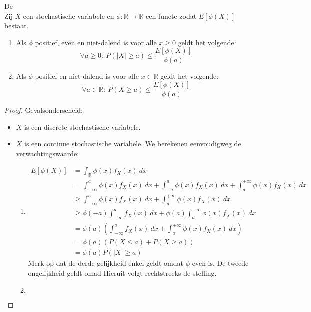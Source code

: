 \documentclass[main.tex]{subfiles}
\begin{document}
\begin{st}
  De \\
  Zij $X$ een stochastische variabele en $\phi:\mathbb{R} \rightarrow \mathbb{R}$ een functe zodat $E[\phi(X)]$ bestaat.
  \begin{enumerate}
  \item Als $\phi$ positief, even en niet-dalend is voor alle $x\ge 0$ geldt het volgende:
    \[ \forall a \ge 0:\ P(|X| \ge a) \le \frac{E[\phi(X)]}{\phi(a)} \]
  \item Als $\phi$ positief en niet-dalend is voor alle $x\in\mathbb{R}$ geldt het volgende:
    \[ \forall a \in \mathbb{R}:\ P(X \ge a) \le \frac{E[\phi(X)]}{\phi(a)} \]
  \end{enumerate}

  \begin{proof}
    Gevalsonderscheid:
    \begin{itemize}
    \item $X$ is een discrete stochastische variabele.
    \item $X$ is een continue stochastische variabele. 
      We berekenen eenvoudigweg de verwachtingswaarde:
      \begin{enumerate}
      \item 
        \begin{align*}
          E[\phi(X)]
          &= \int_{\mathbb{R}}\phi(x)f_{X}(x)\ dx\\
          &= \int_{-\infty}^{a}\phi(x)f_{X}(x)\ dx + \int_{-a}^{a}\phi(x)f_{X}(x)\ dx + \int_{a}^{+\infty}\phi(x)f_{X}(x)\ dx\\
          &\ge \int_{-\infty}^{a}\phi(x)f_{X}(x)\ dx + \int_{a}^{+\infty}\phi(x)f_{X}(x)\ dx\\
          &\ge \phi(-a)\int_{-\infty}^{a}f_{X}(x)\ dx + \phi(a)\int_{a}^{+\infty}\phi(x)f_{X}(x)\ dx\\
          &= \phi(a) \left( \int_{-\infty}^{a}f_{X}(x)\ dx + \int_{a}^{+\infty}\phi(x)f_{X}(x)\ dx\right)\\
          &= \phi(a) \left(P(X \le a) + P(X \ge a)\right)\\
          &= \phi(a)P(|X| \ge a)
        \end{align*}
        Merk op dat de derde gelijkheid enkel geldt omdat $\phi$ even is.
        De tweede ongelijkheid geldt omad
        Hieruit volgt rechtstreeks de stelling.
      \item
        \begin{align*}

\end{align*}
\end{enumerate}
\end{itemize}
\end{proof}
\end{st}
\end{document}
